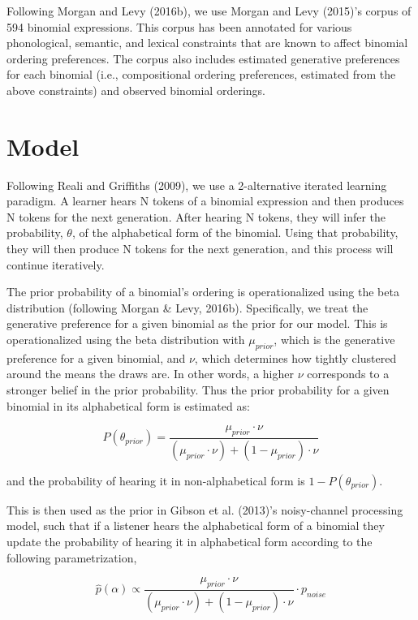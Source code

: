 \documentclass[
  jou,floatsintext]{apa6}
\begin{document}
Following Morgan and Levy (2016b), we use Morgan and Levy (2015)'s corpus of 594 binomial expressions. This corpus has been annotated for various phonological, semantic, and lexical constraints that are known to affect binomial ordering preferences. The corpus also includes estimated generative preferences for each binomial (i.e., compositional ordering preferences, estimated from the above constraints) and observed binomial orderings.

\section{Model}\label{model}

Following Reali and Griffiths (2009), we use a 2-alternative iterated learning paradigm. A learner hears N tokens of a binomial expression and then produces N tokens for the next generation. After hearing N tokens, they will infer the probability, \(\theta\), of the alphabetical form of the binomial. Using that probability, they will then produce N tokens for the next generation, and this process will continue iteratively.

The prior probability of a binomial's ordering is operationalized using the beta distribution (following Morgan \& Levy, 2016b). Specifically, we treat the generative preference for a given binomial as the prior for our model. This is operationalized using the beta distribution with \(\mu_{prior}\), which is the generative preference for a given binomial, and \(\nu\), which determines how tightly clustered around the means the draws are. In other words, a higher \(\nu\) corresponds to a stronger belief in the prior probability. Thus the prior probability for a given binomial in its alphabetical form is estimated as:

\begin{equation}
\label{eq:thetaPrior}
P(\theta_{prior}) = \frac{\mu_{prior} \cdot \nu}{(\mu_{prior} \cdot \nu) + (1 - \mu_{prior}) \cdot \nu}
\end{equation}

and the probability of hearing it in non-alphabetical form is \(1-P(\theta_{prior})\).

This is then used as the prior in Gibson et al. (2013)'s noisy-channel processing model, such that if a listener hears the alphabetical form of a binomial they update the probability of hearing it in alphabetical form according to the following parametrization,

\begin{equation}
\label{eq:phatAlpha}
\hat{p}(\alpha) \propto \frac{\mu_{prior} \cdot \nu}{(\mu_{prior} \cdot \nu) + (1 - \mu_{prior}) \cdot \nu} \cdot p_{noise}
\end{equation}
\end{document}
